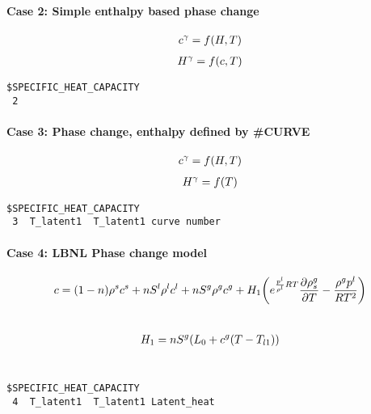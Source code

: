 \paragraph*{Case 2: Simple enthalpy based phase change}
\begin{eqnarray}
  c^\gamma
  = f(H,T)
\end{eqnarray}
\begin{eqnarray}
  H^\gamma
  = f(c,T)
\end{eqnarray}
\begin{verbatim}
$SPECIFIC_HEAT_CAPACITY
 2
\end{verbatim}

\paragraph*{Case 3: Phase change, enthalpy defined by \#CURVE}
\begin{eqnarray}
  c^\gamma
  = f(H,T)
\end{eqnarray}
\begin{eqnarray}
  H^\gamma
  = f(T)
\end{eqnarray}
\begin{verbatim}
$SPECIFIC_HEAT_CAPACITY
 3  T_latent1  T_latent1 curve number
\end{verbatim}

\paragraph*{Case 4: LBNL Phase change model}
\begin{eqnarray}
 c =
(1-n)\rho^sc^s+nS^l\rho^lc^l+nS^g\rho^gc^g+H_1\bigg(e^{\frac{p^l}{\rho^l}RT}\frac{\partial
\rho_s^g}{\partial
T}-\frac{\rho^gp^l}{RT^2}\bigg)
\end{eqnarray}\\

\begin{eqnarray}
H_1=nS^g(L_0+c^g(T-T_{l1}))
\end{eqnarray}\\
\begin{verbatim}
$SPECIFIC_HEAT_CAPACITY
 4  T_latent1  T_latent1 Latent_heat
\end{verbatim}

